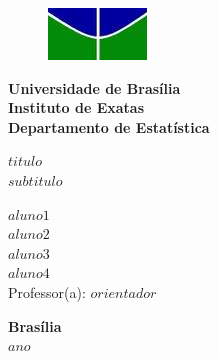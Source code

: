 \documentclass[12pt, a4paper, twoside]{article}
\numberwithin{equation}{subsection} %
\newcommand{\titulo}{$titulo$ \\ $subtitulo$}
\newcommand{\autora}{$aluno1$}
\newcommand{\autorb}{$aluno2$}
\newcommand{\autorc}{$aluno3$}
\newcommand{\autord}{$aluno4$}
\newcommand{\orientador}{ $orientador$ }
\begin{document}
\begin{titlepage}
\begin{center}
\begin{figure}[h!]
	\centering
		\includegraphics[scale = 0.8]{img/unb.png}
	\label{fig:unb}
\end{figure}
{\bf Universidade de Brasília \\
\bf Instituto de Exatas \\
\bf Departamento de Estatística}
\vspace{5cm}

\setcounter{page}{0}
\null
\Large
\textbf{\titulo}
\vspace{2.5cm}

\small
\vspace{0.2cm}
\textbf{\autora}\\
\textbf{\autorb}\\
\textbf{\autorc}\\
\textbf{\autord}\\

\vspace{1.5cm}
\small
Professor(a): \orientador \\
\end{center}



\vspace{5cm}

\begin{center}
{\bf{Brasília} \\ }
\bf{$ano$}
\end{center}
\end{titlepage}



\newpage

\setcounter{page}{2}
\onehalfspacing




\setlength{\parindent}{1.5cm}
\setlength{\parskip}{0.2cm}
\setlength{\intextsep}{0.5cm}

\titlespacing*{\section}{0cm}{0cm}{0.5cm}
\titlespacing*{\subsection}{0cm}{0.5cm}{0.5cm}
\titlespacing*{\subsubsection}{0cm}{0.5cm}{0.5cm}
\titlespacing*{\paragraph}{0cm}{0.5cm}{0.5cm}
\end{document}

